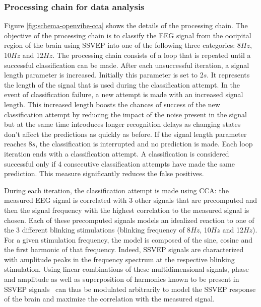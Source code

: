 \documentclass[smallextended]{svjour3}
\begin{document}
\subsubsection{Processing chain for data analysis}
Figure \ref{fig:schema-openvibe-cca} shows the details of the processing chain.
The objective of the processing chain is to classify the EEG signal from the occipital region of the brain using SSVEP into one of the following three categories: 8$Hz$, 10$Hz$ and 12$Hz$.
The processing chain consists of a loop that is repeated until a successful classification can be made.
After each unsuccessful iteration, a signal length parameter is increased. Initially this parameter is set to 2$s$.
It represents the length of the signal that is used during the classification attempt.
In the event of classification failure, a new attempt is made with an increased signal length.
This increased length boosts the chances of success of the new classification attempt by reducing the impact of the noise present in the signal
but at the same time introduces longer recognition delays as changing states don't affect the predictions as quickly as before.
If the signal length parameter reaches 8$s$, the classification is interrupted and no prediction is made.
Each loop iteration ends with a classification attempt.
A classification is considered successful only if 4 consecutive classification attempts have made the same prediction. This measure significantly reduces the false positives.

During each iteration, the classification attempt is made using CCA: the measured EEG signal is correlated with 3 other signals that are precomputed and then the signal frequency with the highest correlation to the measured signal is chosen.
Each of these precomputed signals models an idealized reaction to one of the 3 different blinking stimulations (blinking frequency of 8$Hz$, 10$Hz$ and 12$Hz$).
For a given stimulation frequency, the model is composed of the sine, cosine and the first harmonic of that frequency.
Indeed, SSVEP signals are characterized with amplitude peaks in the frequency spectrum at the respective blinking stimulation.
Using linear combinations of these multidimensional signals, phase and amplitude as well as superposition of harmonics known to be present in SSVEP signals~\cite{herrmann2001} can thus be modulated arbitrarily to model the SSVEP response of the brain and maximize the correlation with the measured signal.
\end{document}
